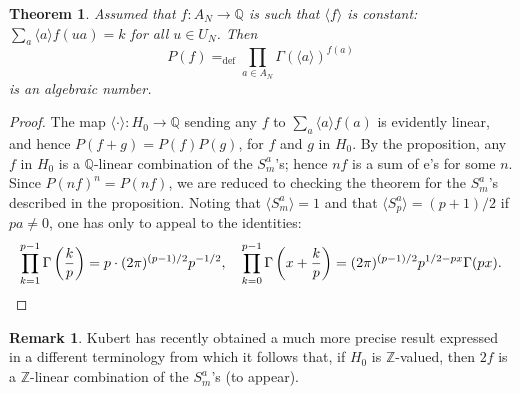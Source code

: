 \documentclass[12pt,a4paper]{article}
\theoremstyle{plain}
\newtheorem{theorem}{Theorem}[section]
\theoremstyle{definition}
\newtheorem{remark}[definition]{Remark}
\theoremstyle{remark}
\newcommand{\Q}{\mathbb{Q}}
\newcommand{\Z}{\mathbb{Z}}
\begin{document}
\begin{theorem}
Assumed that $f: A_N \to \Q$ is such that $\langle f \rangle$ is constant:
$\sum_a \langle a \rangle f(ua) = k$ for all $u \in U_N$. Then
\[
P(f) =_{\text{def}} \prod_{a \in A_N} \Gamma(\langle a \rangle)^{f(a)}
\]
is an algebraic number.
\end{theorem}

\begin{proof}
The map $\langle \cdot \rangle: H_0 \to \Q$ sending any $f$ to $\sum_a \langle a \rangle f(a)$ is evidently linear,
and hence $P(f+g) = P(f) P(g)$, for $f$ and $g$ in $H_0$. By the proposition, any
$f$ in $H_0$ is a $\Q$-linear combination of the $S_m^a$'s; hence $nf$ is a sum of
e's for some $n$. Since $P(nf)^n = P(nf)$, we are reduced to checking the theorem
for the $S_m^a$'s described in the proposition. Noting that $\langle S_m^a \rangle = 1$ and that
$\langle S_p^a \rangle = (p+1)/2$ if $pa \neq 0$, one has only to appeal to the identities:
\[
\prod_{k=1}^{p-1} \Gamma\left(\frac{k}{p}\right) = p \cdot (2\pi)^{(p-1)/2} p^{-1/2},
\quad
\prod_{k=0}^{p-1} \Gamma\left(x + \frac{k}{p}\right) = (2\pi)^{(p-1)/2} p^{1/2-px} \Gamma(px). \qedhere
\]
\end{proof}

\begin{remark}
Kubert has recently obtained a much more precise result expressed in a
different terminology from which it follows that, if $H_0$ is $\Z$-valued, then $2f$
is a $\Z$-linear combination of the $S_m^a$'s (to appear).
\end{remark}
\end{document}
